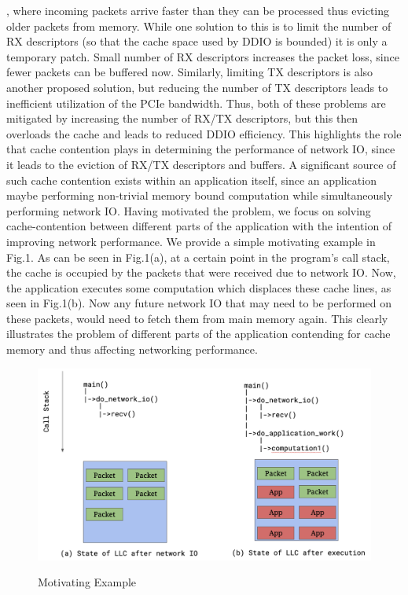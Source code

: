 \documentclass[sigconf,authorversion,noacm]{acmart}
\begin{document}
\cite{tootoonchian-resq}, where incoming packets arrive faster than they can be
processed thus evicting older packets from memory. While one solution to this is
to limit the number of RX descriptors (so that the cache space used by DDIO is
bounded) it is only a temporary patch. Small number of RX descriptors increases
the packet loss, since fewer packets can be buffered now. Similarly, limiting TX
descriptors is also another proposed solution, but reducing the number of TX
descriptors leads to inefficient utilization of the PCIe bandwidth. Thus, both
of these problems are mitigated by increasing the number of RX/TX descriptors,
but this then overloads the cache and leads to reduced DDIO efficiency. This
highlights the role that cache contention plays in determining the performance
of network IO, since it leads to the eviction of RX/TX descriptors and buffers.
A significant source of such cache contention exists within an application
itself, since an application maybe performing non-trivial memory bound
computation while simultaneously performing network IO. Having motivated the
problem, we focus on solving cache-contention between different parts of the
application with the intention of improving network performance. We provide a
simple motivating example in Fig.1. As can be seen in Fig.1(a), at a certain
point in the program's call stack, the cache is occupied by the packets that
were received due to network IO. Now, the application executes some computation
which displaces these cache lines, as seen in Fig.1(b). Now any future network
IO that may need to be performed on these packets, would need to fetch them from
main memory again. This clearly illustrates the problem of different parts of
the application contending for cache memory and thus affecting networking
performance.

\begin{figure}[h]
  \centering
  \includegraphics[width=\linewidth]{motivating_example}
    \label{fig:motivating}
    \caption{Motivating Example}
\end{figure}
\end{document}
